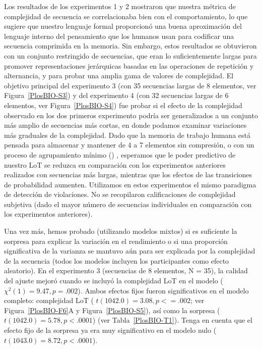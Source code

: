 Los resultados de los experimentos 1 y 2 mostraron que nuestra métrica de complejidad de secuencia se correlacionaba bien con el comportamiento, lo que sugiere que nuestro lenguaje formal proporcionó una buena aproximación del lenguaje interno del pensamiento que los humanos usan para codificar una secuencia comprimida en la memoria. Sin embargo, estos resultados se obtuvieron con un conjunto restringido de secuencias, que eran lo suficientemente largas para promover representaciones jerárquicas basadas en las operaciones de repetición y alternancia, y para probar una amplia gama de valores de complejidad. El objetivo principal del experimento 3 (con 35 secuencias largas de 8 elementos, ver Figura~\ref{PlosBIO-S3}) y del experimento 4 (con 32 secuencias largas de 6 elementos, ver Figura~\ref{PlosBIO-S4}) fue probar si el efecto de la complejidad observado en los dos primeros experimento podría ser generalizados a un conjunto más amplio de secuencias más cortas, en donde podamos examinar variaciones más graduales de la complejidad. Dado que la memoria de trabajo humana está pensada para almacenar y mantener de 4 a 7 elementos sin compresión, o con un proceso de agrupamiento mínimo (\cite{f25,f29}) , esperamos que le poder predictivo de nuestro LoT se reduzca en comparación con los experimentos anteriores realizados con secuencias más largas, mientras que los efectos de las transiciones de probabilidad aumenten. Utilizamos en estos experimentos el mismo paradigma de detección de violaciones. No se recopilaron calificaciones de complejidad subjetiva (dado el mayor número de secuencias individuales en comparación con los experimentos anteriores).


Una vez más, hemos probado (utilizando modelos mixtos) si es suficiente la sorpresa para explicar la variación en el rendimiento o si una proporción significativa de la varianza se mantuvo aún para ser explicada por la complejidad de la secuencia (todos los modelos incluyen los participantes como efecto aleatorio). En el experimento 3 (secuencias de 8 elementos, N = 35), la calidad del ajuste mejoró cuando se incluyó la complejidad LoT en el modelo ($\chi^2(1) = 9.47, p= .002$). Ambos efectos fijos fueron significativos en el modelo completo: complejidad LoT ( $t ( 1042.0) = 3.08, p <=.002$; ver Figura~\ref{PlosBIO-F6}A y Figura~\ref{PlosBIO-S5}), así como la sorpresa ($t ( 1042.0) = 5.78, p <.0001$) (ver Tabla~\ref{PlosBIO-T1}). Tenga en cuenta que el efecto fijo de la sorpresa ya era muy significativo en el modelo nulo ($t (1043.0) = 8.72, p <.0001$).

